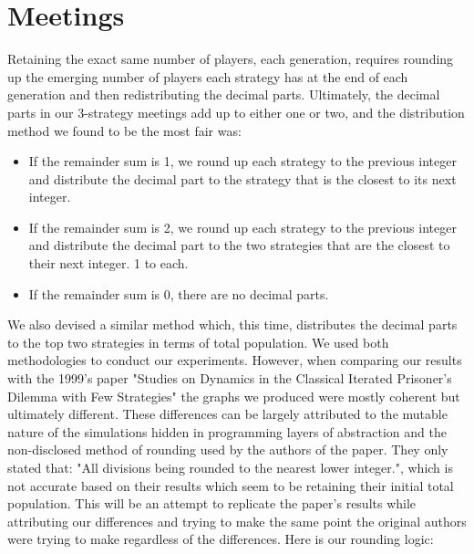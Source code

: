 \documentclass[12pt]{article}
\begin{document}
\section{Meetings}
Retaining the exact same number of players, each generation, requires rounding up the emerging number of players each strategy has at the end of each generation and then redistributing the decimal parts. Ultimately, the decimal parts in our 3-strategy meetings add up to either one or two, and the distribution method we found to be the most fair was:
\begin{itemize}
    \item If the remainder sum is 1, we round up each strategy to the previous integer and distribute the decimal part to the strategy that is the closest to its next integer.
    \item If the remainder sum is 2, we round up each strategy to the previous integer and distribute the decimal part to the two strategies that are the closest to their next integer. 1 to each.
    \item If the remainder sum is 0, there are no decimal parts.
\end{itemize}
We also devised a similar method which, this time, distributes the decimal parts to the top two strategies in terms of total population. We used both methodologies to conduct our experiments. However, when comparing our results with the 1999's paper "Studies on Dynamics in the Classical Iterated Prisoner's Dilemma with Few Strategies" the graphs we produced were mostly coherent but ultimately different. These differences can be largely attributed to the mutable nature of the simulations hidden in programming layers of abstraction and the non-disclosed method of rounding used by the authors of the paper. They only stated that: "All divisions being rounded to the nearest lower integer.", which is not accurate based on their results which seem to be retaining their initial total population. This will be an attempt to replicate the paper's results while attributing our differences and trying to make the same point the original authors were trying to make regardless of the differences. Here is our rounding logic:
\end{document}
